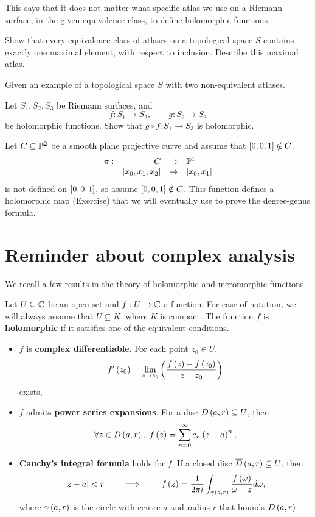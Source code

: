 This says that it does not matter what specific atlas we use on a Riemann surface, in the given equivalence class, to define holomorphic functions.

\begin{exercise}
Show that every equivalence class of atlases on a topological space $ S $ contains exactly one maximal element, with respect to inclusion. Describe this maximal atlas.
\end{exercise}

\begin{exercise}
Given an example of a topological space $ S $ with two non-equivalent atlases.
\end{exercise}

\begin{exercise}
Let $ S_1, S_2, S_3 $ be Riemann surfaces, and
$$ f : S_1 \to S_2, \qquad g : S_2 \to S_3 $$
be holomorphic functions. Show that $ g \circ f : S_1 \to S_3 $ is holomorphic.
\end{exercise}

\begin{example}
\label{eg:15.12}
Let $ C \subseteq \P^2 $ be a smooth plane projective curve and assume that $ \sb{0, 0, 1} \notin C $.
$$ \function[\pi]{C}{\P^1}{\sb{x_0, x_1, x_2}}{\sb{x_0, x_1}} $$
is not defined on $ \sb{0, 0, 1} $, so assume $ \sb{0, 0, 1} \notin C $. This function defines a holomorphic map (Exercise) that we will eventually use to prove the degree-genus formula.
\end{example}

\pagebreak

\section{Reminder about complex analysis}

We recall a few results in the theory of holomorphic and meromorphic functions.

\begin{definition}
Let $ U \subseteq \C $ be an open set and $ f : U \to \C $ a function. For ease of notation, we will always assume that $ U \subseteq K $, where $ K $ is compact. The function $ f $ is \textbf{holomorphic} if it satisfies one of the equivalent conditions.
\begin{itemize}
\item $ f $ is \textbf{complex differentiable}. For each point $ z_0 \in U $,
$$ f'\rb{z_0} = \lim_{z \to z_0}\rb{\dfrac{f\rb{z} - f\rb{z_0}}{z - z_0}} $$
exists,
\item $ f $ admits \textbf{power series expansions}. For a disc $ D\rb{a, r} \subseteq U $, then
$$ \forall z \in D\rb{a, r}, \ f\rb{z} = \sum_{n = 0}^\infty c_n\rb{z - a}^n, $$
\item \textbf{Cauchy's integral formula} holds for $ f $. If a closed disc $ \overline{D}\rb{a, r} \subseteq U $, then
$$ \abs{z - a} < r \qquad \implies \qquad f\rb{z} = \dfrac{1}{2\pi i} \int_{\gamma\rb{a, r}} \dfrac{f\rb{\omega}}{\omega - z} d\omega, $$
where $ \gamma\rb{a, r} $ is the circle with centre $ a $ and radius $ r $ that bounds $ D\rb{a, r} $.
\end{itemize}
\end{definition}

